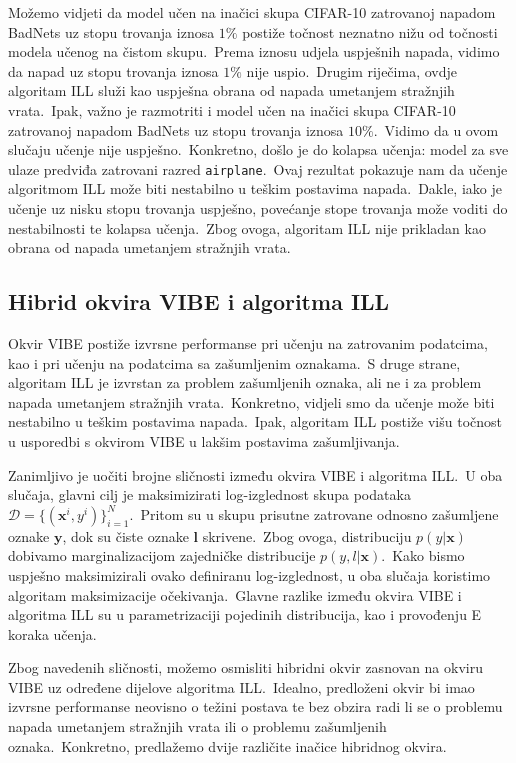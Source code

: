 \documentclass[diplomskirad]{fer}
\begin{document}
Možemo vidjeti da model učen na inačici skupa CIFAR-10 zatrovanoj napadom BadNets uz stopu trovanja iznosa $1\%$ postiže točnost neznatno nižu od točnosti modela učenog na čistom skupu.\ 
Prema iznosu udjela uspješnih napada, vidimo da napad uz stopu trovanja iznosa $1\%$ nije uspio.\ Drugim riječima, ovdje algoritam ILL služi kao uspješna obrana od napada umetanjem stražnjih vrata.\ 
Ipak, važno je razmotriti i model učen na inačici skupa CIFAR-10 zatrovanoj napadom BadNets uz stopu trovanja iznosa $10\%$.\ 
Vidimo da u ovom slučaju učenje nije uspješno.\ Konkretno, došlo je do kolapsa učenja: model za sve ulaze predviđa zatrovani razred \texttt{airplane}.\ 
Ovaj rezultat pokazuje nam da učenje algoritmom ILL može biti nestabilno u teškim postavima napada.\ 
Dakle, iako je učenje uz nisku stopu trovanja uspješno, povećanje stope trovanja može voditi do nestabilnosti te kolapsa učenja.\ 
Zbog ovoga, algoritam ILL nije prikladan kao obrana od napada umetanjem stražnjih vrata.\ 

\subsection{Hibrid okvira VIBE i algoritma ILL}
\label{sub:hibrid_vibe_ill}

Okvir VIBE postiže izvrsne performanse pri učenju na zatrovanim podatcima, kao i pri učenju na podatcima sa zašumljenim oznakama.\
S druge strane, algoritam ILL je izvrstan za problem zašumljenih oznaka, ali ne i za problem napada umetanjem stražnjih vrata.\ 
Konkretno, vidjeli smo da učenje može biti nestabilno u teškim postavima napada.\ Ipak, algoritam ILL postiže višu točnost u usporedbi s okvirom VIBE u lakšim postavima zašumljivanja.\ 

Zanimljivo je uočiti brojne sličnosti između okvira VIBE i algoritma ILL.\ U oba slučaja, glavni cilj je maksimizirati log-izglednost skupa podataka $\mathcal{D} = \{(\bm{x}^i, y^i)\}_{i=1}^{N}$.\ 
Pritom su u skupu prisutne zatrovane odnosno zašumljene oznake $\bm{y}$, dok su čiste oznake $\bm{l}$ skrivene.\ Zbog ovoga, distribuciju $p(y | \bm{x})$ dobivamo marginalizacijom zajedničke distribucije $p(y, l | \bm{x})$.\ 
Kako bismo uspješno maksimizirali ovako definiranu log-izglednost, u oba slučaja koristimo algoritam maksimizacije očekivanja.\ 
Glavne razlike između okvira VIBE i algoritma ILL su u parametrizaciji pojedinih distribucija, kao i provođenju E koraka učenja.\ 

\pagebreak

Zbog navedenih sličnosti, možemo osmisliti hibridni okvir zasnovan na okviru VIBE uz određene dijelove algoritma ILL.\ 
Idealno, predloženi okvir bi imao izvrsne performanse neovisno o težini postava te bez obzira radi li se o problemu napada umetanjem stražnjih vrata ili o problemu zašumljenih oznaka.\ 
Konkretno, predlažemo dvije različite inačice hibridnog okvira.\ 
\end{document}
